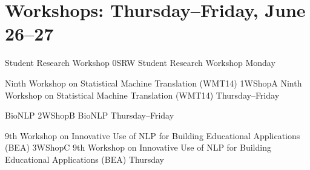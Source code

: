 \vspace*{-3cm}\par
\chapter{Workshops: Thursday--Friday, June 26--27}
\thispagestyle{emptyheader}




\begin{wsschedule}
  {Student Research Workshop}
  {0}{SRW}
  {Student Research Workshop}
  {Monday}
  {\SRWLoc}
  
\end{wsschedule}

\clearpage
{}

\begin{wsschedule}
  {Ninth Workshop on Statistical Machine Translation (WMT14)}
  {1}{WShopA}
  {Ninth Workshop on Statistical Machine Translation (WMT14)}
  {Thursday--Friday}
  {\WShopLocA}
  
\end{wsschedule}
        
\begin{wsschedule}
  {BioNLP}
  {2}{WShopB}
  {BioNLP}
  {Thursday--Friday}
  {\WShopLocB}
  
\end{wsschedule}


\begin{wsschedule}
  {9th Workshop on Innovative Use of NLP for Building Educational Applications (BEA)}
  {3}{WShopC}
  {9th Workshop on Innovative Use of NLP for Building Educational Applications (BEA)}
  {Thursday}
  {\WShopLocC}
  \clearpage
\end{wsschedule}

